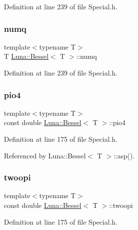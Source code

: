 Definition at line 239 of file Special.\+h.

\mbox{\label{structLuna_1_1Bessel_aa126082495f16ae7d353f0b0623c80b8}} 
\subsubsection{\texorpdfstring{numq}{numq}}
{\footnotesize\ttfamily template$<$typename T$>$ \\
T \hyperlink{structLuna_1_1Bessel}{Luna\+::\+Bessel}$<$ T $>$\+::numq}



Definition at line 239 of file Special.\+h.

\mbox{\label{structLuna_1_1Bessel_a25963b9942422f3d48c0239e8be57f0c}} 
\subsubsection{\texorpdfstring{pio4}{pio4}}
{\footnotesize\ttfamily template$<$typename T$>$ \\
const double \hyperlink{structLuna_1_1Bessel}{Luna\+::\+Bessel}$<$ T $>$\+::pio4}



Definition at line 175 of file Special.\+h.



Referenced by Luna\+::\+Bessel$<$ T $>$\+::asp().

\mbox{\label{structLuna_1_1Bessel_a4c3a3f91a127b39c913845c77f377c79}} 
\subsubsection{\texorpdfstring{twoopi}{twoopi}}
{\footnotesize\ttfamily template$<$typename T$>$ \\
const double \hyperlink{structLuna_1_1Bessel}{Luna\+::\+Bessel}$<$ T $>$\+::twoopi}



Definition at line 175 of file Special.\+h.

